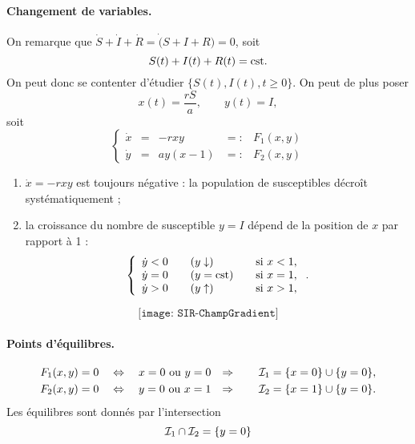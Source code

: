 \paragraph*{Changement de variables.}
On remarque que $\dot S + \dot I + \dot R = \dot (S + I + R) = 0$, soit 
$$
S(t) + I(t) + R(t) = \text{cst}.
$$
On peut donc se contenter d'étudier $\{S(t), I(t), t \geq 0\}$. On peut de plus poser 
$$
x(t) = \frac{rS}a, \qquad y(t) = I,
$$
soit
$$
\left\{\begin{array}{rclcl}
        \dot x & = & -r x y & =: & F_1(x, y) \\
        \dot y & = & a y (x - 1) & =: & F_2(x, y)
       \end{array}\right.
$$

\remarks
\begin{enumerate}
  \item $\dot x = - rxy$ est toujours négative : la population de susceptibles décroît systématiquement ; 
  \item la croissance du nombre de susceptible $y = I$ dépend de la position de $x$ par rapport à 1 :
  $$
  \left\{\begin{array}{lllll}
                \dot y < 0 & & (y \downarrow) & & \text{si } x < 1, \\
                \dot y = 0 & & (y = \text{cst}) & & \text{si } x = 1, \\
                \dot y > 0 & & (y \uparrow) & & \text{si } x > 1,
                \end{array}\right..
  $$
\end{enumerate}
$$
\texttt{[image: SIR-ChampGradient]}
$$

\paragraph*{Points d'équilibres.}
\begin{align*}
  F_1(x, y) & = 0 \quad \Leftrightarrow \quad x = 0 \text{ ou } y = 0 &
  \Rightarrow \qquad \mathcal{I}_1 & = \{x = 0\} \cup \{y = 0\}, \\
  F_2(x, y) & = 0 \quad \Leftrightarrow \quad y = 0 \text{ ou } x = 1 &
  \Rightarrow \qquad \mathcal{I}_2 & = \{x = 1\} \cup \{y = 0\}.
\end{align*}
Les équilibres sont donnés par l'intersection 
$$
\mathcal{I}_1 \cap \mathcal{I}_2 = \{y = 0\}
$$

